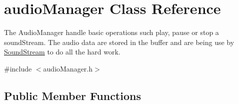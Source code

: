 \hypertarget{classaudioManager}{}\section{audio\+Manager Class Reference}
\label{classaudioManager}


The Audio\+Manager handle basic operations such play, pause or stop a sound\+Stream. The audio data are stored in the buffer and are being use by \hyperlink{classSoundStream}{Sound\+Stream} to do all the hard work.  




{\ttfamily \#include $<$audio\+Manager.\+h$>$}

\subsection*{Public Member Functions}
